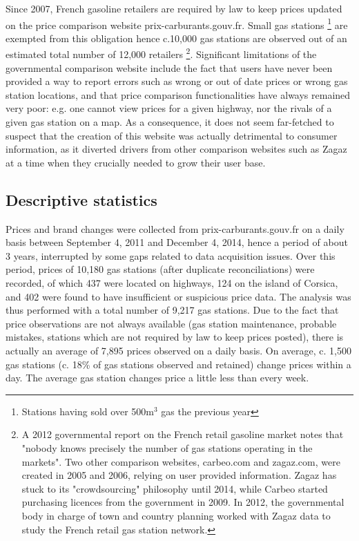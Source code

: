 \documentclass[english]{article}
\begin{document}
Since 2007, French gasoline retailers are required by law to keep prices updated on the price comparison website prix-carburants.gouv.fr. Small gas stations%
\footnote{Stations having sold over 500m$^{3}$ gas the previous year%
} are exempted from this obligation hence c.10,000 gas stations are observed out of an estimated total number of 12,000 retailers%
\footnote{A 2012 governmental report on the French retail gasoline market notes that "nobody knows precisely the number of gas stations operating in the markets". Two other comparison websites, carbeo.com and zagaz.com, were created in 2005 and 2006, relying on user provided information. Zagaz has stuck to its "crowdsourcing" philosophy until 2014, while Carbeo started purchasing licences from the government in 2009. In 2012, the governmental body in charge of town and country planning worked with Zagaz data to study the French retail gas station network.%
}.
Significant limitations of the governmental comparison website include the fact that users have never been provided a way to report errors such as wrong or out of date prices or wrong gas station locations, and that price comparison functionalities have always remained very poor: e.g. one cannot view prices for a given highway, nor the rivals of a given gas station on a map. As a consequence, it does not seem far-fetched to suspect that the creation of this website was actually detrimental to consumer information, as it diverted drivers from other comparison websites such as Zagaz at a time when they crucially needed to grow their user base.

\subsection{Descriptive statistics}

Prices and brand changes were collected from prix-carburants.gouv.fr on a daily basis between September 4, 2011 and December 4, 2014, hence a period of about 3 years, interrupted by some gaps related to data acquisition issues. Over this period, prices of 10,180 gas stations (after duplicate reconciliations) were recorded, of which 437 were located on highways, 124 on the island of Corsica, and 402 were found to have insufficient or suspicious price data. The analysis was thus performed with a total number of 9,217 gas stations. Due to the fact that price observations are not always available (gas station maintenance, probable mistakes, stations which are not required by law to keep prices posted), there is actually an average of 7,895 prices observed on a daily basis. On average, c. 1,500 gas stations (c. 18\% of gas stations observed and retained) change prices within a day. The average gas station changes price a little less than every week.
\end{document}
